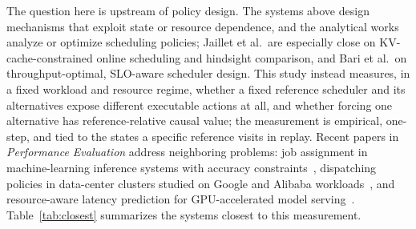 \documentclass[preprint,12pt]{elsarticle}
\begin{document}
The question here is upstream of policy design. The systems above design
mechanisms that exploit state or resource dependence, and the analytical works
analyze or optimize scheduling policies; Jaillet et al.\ are especially close on
KV-cache-constrained online scheduling and hindsight comparison, and Bari et al.\ on
throughput-optimal, SLO-aware scheduler design. This study instead measures,
in a fixed workload and resource regime, whether a fixed reference scheduler and
its alternatives expose different executable actions at all, and whether forcing
one alternative has reference-relative causal value; the measurement is
empirical, one-step, and tied to the states a specific reference visits in
replay. Recent papers in \emph{Performance Evaluation} address neighboring
problems: job assignment in machine-learning inference systems with accuracy
constraints~\cite{choudhury2025job}, dispatching policies in data-center
clusters studied on Google and Alibaba workloads~\cite{yildiz2026dispatching},
and resource-aware latency prediction for GPU-accelerated model
serving~\cite{liang2026lilou}. Table~\ref{tab:closest} summarizes the
systems closest to this measurement.
\end{document}
